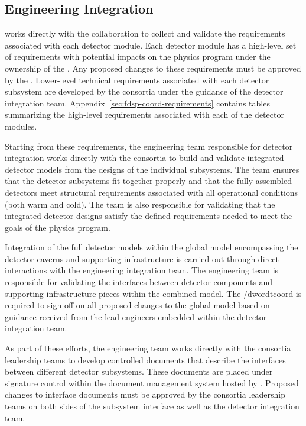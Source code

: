 \subsection{Engineering Integration}

  works directly with the collaboration to
collect and validate the requirements associated with each detector
module.  Each detector module has a high-level set of requirements
with potential impacts on the  physics program under
the ownership of the  .  Any proposed
changes to these requirements must be approved by the .
Lower-level technical requirements associated with each detector
subsystem are developed by the consortia under the guidance of
the  detector integration team.  Appendix~\ref{sec:fdsp-coord-requirements}
contains tables summarizing the high-level requirements associated
with each of the detector modules.

Starting from these requirements, the  engineering
team responsible for detector integration works directly with the
 consortia to build and validate integrated detector
models from the designs of the individual subsystems.  The team
ensures that the detector subsystems fit together properly and
that the fully-assembled detectors meet structural requirements
associated with all operational conditions (both warm and cold).
The team is also responsible for validating that the integrated
detector designs satisfy the defined requirements needed to meet
the goals of the  physics program.

Integration of the full detector models within the global model
encompassing the detector caverns and supporting infrastructure
is carried out through direct interactions with the 
engineering integration team.  The  engineering team
is responsible for validating the interfaces between 
detector components and supporting infrastructure pieces within
the combined model.  The /dword{tcoord} is required to sign off
on all proposed changes to the global model based on guidance
received from the lead engineers embedded within the 
detector integration team.

As part of these efforts, the engineering team works directly
with the consortia leadership teams to develop controlled
documents that describe the interfaces between different detector
subsystems.  These documents are placed under signature control
within the  document management system hosted by
.  Proposed changes to interface documents must be approved
by the consortia leadership teams on both sides of the subsystem
interface as well as the  detector integration team.

